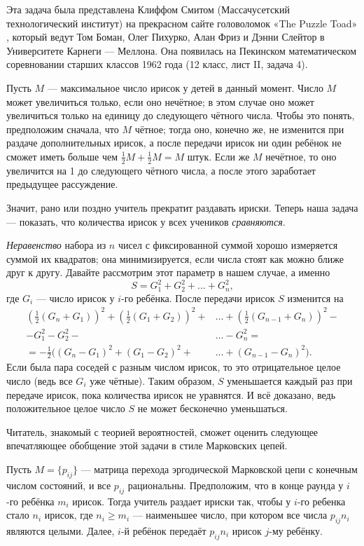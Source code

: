 Эта задача была представлена Клиффом Смитом (Массачусетский технологический институт) на прекрасном сайте головоломок «The Puzzle Toad» \cite{bohman-pikhurko-frieze-sleator}, который ведут Том Боман, Олег Пихурко, Алан Фриз и Дэнни Слейтор в Университете Карнеги --- Меллона.
Она появилась на Пекинском математическом соревновании старших классов 1962 года (12 класс, лист II, задача 4).

Пусть $M$ --- максимальное число ирисок у детей в данный момент.
Число $M$ может увеличиться только, если оно нечётное;
в этом случае оно может увеличиться только на единицу до следующего чётного числа.
Чтобы это понять, предположим сначала, что $M$ чётное; тогда оно, конечно же, не изменится при раздаче дополнительных ирисок, а после передачи ирисок ни один ребёнок не сможет иметь больше чем $\tfrac12 M + \tfrac12 M = M$ штук.
Если же $M$ нечётное, то оно увеличится на 1 до следующего чётного числа, а после этого заработает предыдущее рассуждение.

Значит, рано или поздно учитель прекратит раздавать ириски.
Теперь наша задача --- показать, что количества ирисок у всех учеников \emph{сравняются}.

\emph{Неравенство} набора из $n$ чисел с фиксированной суммой хорошо измеряется суммой их квадратов; она минимизируется, если числа стоят как можно ближе друг к другу.
Давайте рассмотрим этот параметр в нашем случае, а именно 
\[S = G^2_1 + G^2_2 + \dots + G^2_n,\]
где $G_i$ --- число ирисок у $i$-го ребёнка.
После передачи ирисок $S$ изменится на
\begin{align*}
\left(\tfrac{1}{2}(G_n+G_1)\right)^2+\left(\tfrac{1}{2}(G_1+G_2)\right)^2+&\dots+\left(\tfrac{1}{2}(G_{n-1}+G_n)\right)^2-
\\
-G_1^2-G_2^2-&\dots-G_n^2=
\\
=-\tfrac12\bigl((G_n-G_1)^2+(G_1-G_2)^2+&\dots+(G_{n-1}-G_n)^2\bigr).
\end{align*}
Если была пара соседей с разным числом ирисок, то это отрицательное целое число (ведь все $G_i$ уже чётные).
Таким образом, $S$ уменьшается каждый раз при передаче ирисок, пока количества ирисок не уравнятся.
И всё доказано, ведь положительное целое число $S$ не может бесконечно уменьшаться.

\medskip

Читатель, знакомый с теорией вероятностей, сможет оценить следующее впечатляющее обобщение этой задачи в стиле Марковских цепей.

Пусть $M=\{p_{ij}\}$ --- матрица перехода эргодической Марковской цепи с конечным числом состояний, и все $p_{ij}$ рациональны.
Предположим, что в конце раунда у $i$-го ребёнка $m_i$ ирисок.
Тогда учитель раздает ириски так, чтобы у $i$-го ребенка стало $n_i$ ирисок, где $n_i\ge m_i$ --- наименьшее число, при котором все числа $p_{ij}n_i$ являются целыми.
Далее, $i$-й ребёнок передаёт $p_{ij}n_i$ ирисок $j$-му ребёнку.

